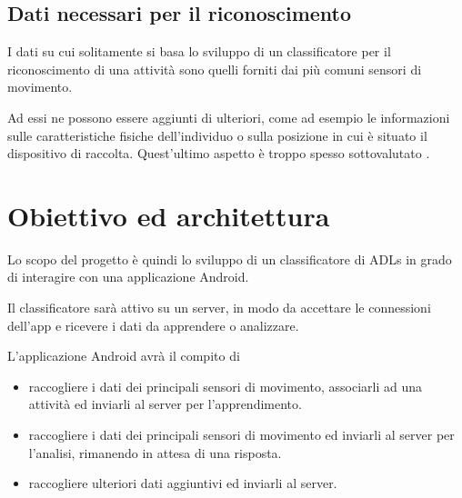 \subsection{Dati necessari per il riconoscimento}
I dati su cui solitamente si basa lo sviluppo di un classificatore per il riconoscimento di una attività sono quelli forniti dai 
più comuni sensori di movimento.

Ad essi ne possono essere aggiunti di ulteriori, come ad esempio le informazioni sulle caratteristiche fisiche
dell'individuo o sulla posizione in cui è situato il dispositivo di raccolta.
Quest'ultimo aspetto è troppo spesso sottovalutato \cite{umafall}.



\section{Obiettivo ed architettura}
Lo scopo del progetto è quindi lo sviluppo di un classificatore di ADLs in grado di interagire con una applicazione
Android.

Il classificatore sarà attivo su un server, in modo da accettare le connessioni dell'app e ricevere i dati da apprendere 
o analizzare.

L'applicazione Android avrà il compito di
\begin{itemize}
    \item raccogliere i dati dei principali sensori di movimento, associarli ad una attività ed inviarli al server per l'apprendimento.
    \item raccogliere i dati dei principali sensori di movimento ed inviarli al server per l'analisi, rimanendo in attesa di una risposta.
    \item raccogliere ulteriori dati aggiuntivi ed inviarli al server.
\end{itemize}